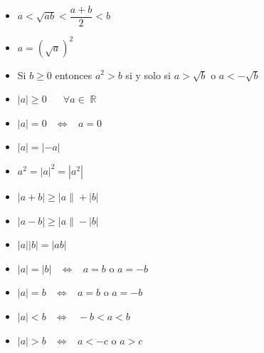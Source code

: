 \documentclass[12pt, fleqn]{report}                             %
\DeclareMathOperator \Space     {\quad}                         %
\DeclareMathOperator \MiniSpace {\;}                            %
\theoremstyle{break}                                            %
\newcommand \lEqual  {\MiniSpace \Leftrightarrow \MiniSpace}    %
\DeclareMathOperator \Reals        {\mathbb{R}}                 %
\begin{document}
            \begin{itemize}

                    \item $a < \sqrt{ab} < \dfrac{a+b}{2} < b$

                    \item $a = (\sqrt{a})^2$

                    \item Si $b \geq 0$ entonces $a^2 > b$ si y solo si $a>\sqrt{b}$ o $a<-\sqrt{b}$

                    \item $|a| \geq 0 \Space \forall a \in \Reals$

                    \item $|a| = 0 \lEqual a = 0$
                    
                    \item $|a| = |-a|$
                    
                    \item $a^2 = |a|^2 = |a^2|$
                    
                    \item $|a+b| \geq |a\| + |b|$
                    
                    \item $|a-b| \geq |a\| - |b|$
                    
                    \item $|a||b| = |ab|$

                    \item $|a| = |b| \lEqual a = b$ o $a = -b$

                    \item $|a| = b \lEqual a = b$ o $a = -b$

                    \item $|a| < b \lEqual -b < a < b$
                    \item $|a| > b \lEqual a < -c $ o $a > c$

            \end{itemize}

        

    
\end{document}
